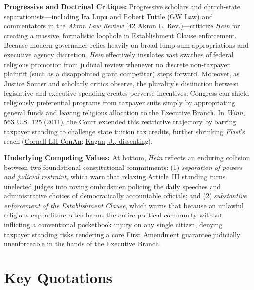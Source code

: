 \documentclass[12pt]{article}
\begin{document}
\textbf{Progressive and Doctrinal Critique:} Progressive scholars and church-state separationists---including Ira Lupu and Robert Tuttle (\href{https://scholarship.law.gwu.edu/cgi/viewcontent.cgi?article=2151&context=faculty_publications}{GW Law}) and commentators in the \textit{Akron Law Review} (\href{https://ideaexchange.uakron.edu/akronlawreview/vol42/iss4/15/}{42 Akron L. Rev.})---criticize \textit{Hein} for creating a massive, formalistic loophole in Establishment Clause enforcement. Because modern governance relies heavily on broad lump-sum appropriations and executive agency discretion, \textit{Hein} effectively insulates vast swathes of federal religious promotion from judicial review whenever no discrete non-taxpayer plaintiff (such as a disappointed grant competitor) steps forward. Moreover, as Justice Souter and scholarly critics observe, the plurality's distinction between legislative and executive spending creates perverse incentives: Congress can shield religiously preferential programs from taxpayer suits simply by appropriating general funds and leaving religious allocation to the Executive Branch. In \textit{Winn}, 563 U.S. 125 (2011), the Court extended this restrictive trajectory by barring taxpayer standing to challenge state tuition tax credits, further shrinking \textit{Flast}'s reach (\href{https://www.law.cornell.edu/constitution-conan/article-3/section-2/clause-1/taxpayer-standing}{Cornell LII ConAn}; \href{https://www.law.cornell.edu/supct/html/09-987.ZD.html}{Kagan, J., dissenting}).

\textbf{Underlying Competing Values:} At bottom, \textit{Hein} reflects an enduring collision between two foundational constitutional commitments: (1) \textit{separation of powers and judicial restraint}, which warn that relaxing Article~III standing turns unelected judges into roving ombudsmen policing the daily speeches and administrative choices of democratically accountable officials; and (2) \textit{substantive enforcement of the Establishment Clause}, which warns that because an unlawful religious expenditure often harms the entire political community without inflicting a conventional pocketbook injury on any single citizen, denying taxpayer standing risks rendering a core First Amendment guarantee judicially unenforceable in the hands of the Executive Branch.

\section{Key Quotations}
\end{document}
